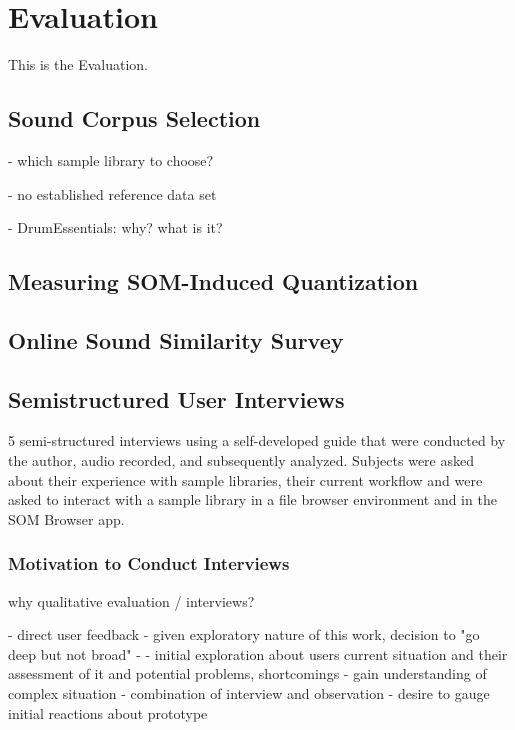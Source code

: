 
\section{Evaluation}
\label{sec:evaluation}
This is the Evaluation.

\subsection{Sound Corpus Selection}
\label{subsec:eval_corpus_selection}
- which sample library to choose?

- no established reference data set

- DrumEssentials: why? what is it?

\subsection{Measuring SOM-Induced Quantization}
\label{subsec:evaluation_tech}

\subsection{Online Sound Similarity Survey}
\label{subsec:evaluation_survey}

\subsection{Semistructured User Interviews}
\label{subsec:evaluation_interviews}

5 semi-structured interviews using a self-developed guide that were conducted
by the author, audio recorded, and subsequently analyzed. Subjects were asked
about their experience with sample libraries, their current workflow and were
asked to interact with a sample library in a file browser environment and in
the SOM Browser app.

\subsubsection{Motivation to Conduct Interviews}
\label{subsubsec:interview_motivation}

why qualitative evaluation / interviews?

- direct user feedback
- given exploratory nature of this work, decision to "go deep but not
broad"
-
- initial exploration about users current situation and their assessment
of it and potential problems, shortcomings
- gain understanding of complex situation
- combination of interview and observation
- desire to gauge initial reactions about prototype

